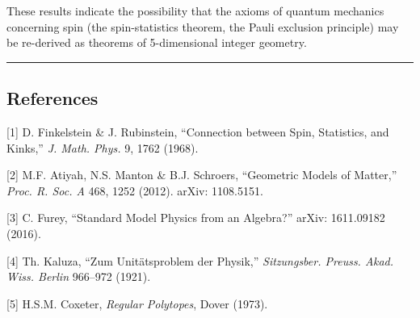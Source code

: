 \documentclass[a4paper,11pt]{article}
\begin{document}
These results indicate the possibility that the axioms of quantum mechanics concerning spin (the spin-statistics theorem, the Pauli exclusion principle) may be re-derived as theorems of 5-dimensional integer geometry.

\begin{center}\rule{0.5\linewidth}{0.5pt}\end{center}

\subsection*{References}

{[}1{]} D. Finkelstein \& J. Rubinstein, ``Connection between Spin,
Statistics, and Kinks,'' \emph{J. Math. Phys.} 9, 1762 (1968).

{[}2{]} M.F. Atiyah, N.S. Manton \& B.J. Schroers, ``Geometric Models
of Matter,'' \emph{Proc. R. Soc. A} 468, 1252 (2012). arXiv: 1108.5151.

{[}3{]} C. Furey, ``Standard Model Physics from an Algebra?'' arXiv:
1611.09182 (2016).

{[}4{]} Th. Kaluza, ``Zum Unit\"atsproblem der Physik,''
\emph{Sitzungsber. Preuss. Akad. Wiss. Berlin} 966--972 (1921).

{[}5{]} H.S.M. Coxeter, \emph{Regular Polytopes}, Dover (1973).
\end{document}
